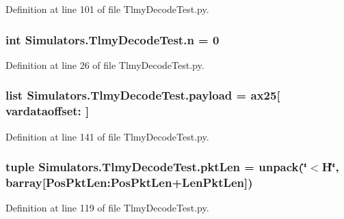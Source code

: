 Definition at line 101 of file Tlmy\+Decode\+Test.\+py.

\hypertarget{namespace_simulators_1_1_tlmy_decode_test_ad836a39f9bcd20345b56d01f58eecaf1}{}
\subsubsection[{n}]{\setlength{\rightskip}{0pt plus 5cm}int Simulators.\+Tlmy\+Decode\+Test.\+n = 0}\label{namespace_simulators_1_1_tlmy_decode_test_ad836a39f9bcd20345b56d01f58eecaf1}


Definition at line 26 of file Tlmy\+Decode\+Test.\+py.

\hypertarget{namespace_simulators_1_1_tlmy_decode_test_abe7d12cdc50e34bef3a5fb88f5e58128}{}
\subsubsection[{payload}]{\setlength{\rightskip}{0pt plus 5cm}list Simulators.\+Tlmy\+Decode\+Test.\+payload = {\bf ax25}\mbox{[} vardataoffset\+: \mbox{]}}\label{namespace_simulators_1_1_tlmy_decode_test_abe7d12cdc50e34bef3a5fb88f5e58128}


Definition at line 141 of file Tlmy\+Decode\+Test.\+py.

\hypertarget{namespace_simulators_1_1_tlmy_decode_test_afab9717fd950d1017ab3cf69343e03a4}{}
\subsubsection[{pkt\+Len}]{\setlength{\rightskip}{0pt plus 5cm}tuple Simulators.\+Tlmy\+Decode\+Test.\+pkt\+Len = unpack(\char`\"{}$<$H\char`\"{}, barray\mbox{[}Pos\+Pkt\+Len\+:\+Pos\+Pkt\+Len+{\bf Len\+Pkt\+Len}\mbox{]})}\label{namespace_simulators_1_1_tlmy_decode_test_afab9717fd950d1017ab3cf69343e03a4}


Definition at line 119 of file Tlmy\+Decode\+Test.\+py.

\hypertarget{namespace_simulators_1_1_tlmy_decode_test_af8aa110404c9f747ad0f9cac7b852c75}{}
